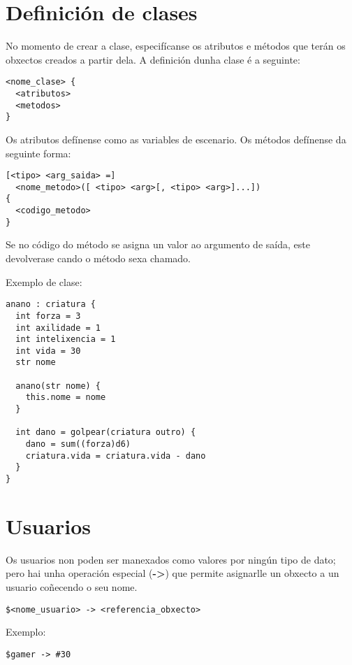 \section{Definición de clases}
No momento de crear a clase, especifícanse os atributos e métodos que terán os
obxectos creados a partir dela. A definición dunha clase é a seguinte:
\begin{lstlisting}
<nome_clase> {
  <atributos>
  <metodos>
}
\end{lstlisting}
\par Os atributos defínense como as variables de escenario. Os métodos defínense
da seguinte forma:
\begin{lstlisting}
[<tipo> <arg_saida> =]
  <nome_metodo>([ <tipo> <arg>[, <tipo> <arg>]...])
{
  <codigo_metodo>
}
\end{lstlisting}
\par Se no código do método se asigna un valor ao argumento de saída, este
devolverase cando o método sexa chamado.
\par Exemplo de clase:
\begin{lstlisting}
anano : criatura {
  int forza = 3
  int axilidade = 1
  int intelixencia = 1
  int vida = 30
  str nome
  
  anano(str nome) {
    this.nome = nome
  }
  
  int dano = golpear(criatura outro) {
    dano = sum((forza)d6)
    criatura.vida = criatura.vida - dano
  }
}
\end{lstlisting}

\section{Usuarios}
Os usuarios non poden ser manexados como valores por ningún tipo de dato; pero
hai unha operación especial ({\bf -\textgreater}) que permite asignarlle un
obxecto a un usuario coñecendo o seu nome.
\begin{lstlisting}
$<nome_usuario> -> <referencia_obxecto>
\end{lstlisting}
\par Exemplo:
\begin{lstlisting}
$gamer -> #30
\end{lstlisting}